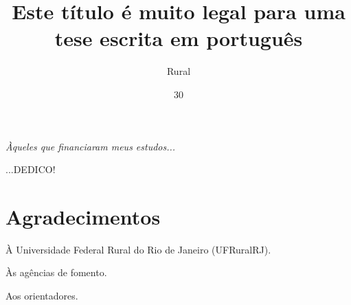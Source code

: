 \documentclass[tese]{UFRuralRJ}
\title{Este título é muito legal para uma tese escrita em português} %
\author{Rural}{Nome do Melhor Estudante da} %
\date{30}{Fevereiro}{2016} %
\begin{document}
\maketitle


\makeapprove


\clearpage\mbox{}\vfill\hspace{80mm}
\begin{minipage}{76mm}
  \begin{flushright}
    {\em
    Àqueles que financiaram meus estudos...
    \par
    ...DEDICO!
    }
  \end{flushright}
\end{minipage}


\chapter*{Agradecimentos}

À Universidade Federal Rural do Rio de Janeiro (UFRuralRJ).

Às agências de fomento.

Aos orientadores.
\end{document}
